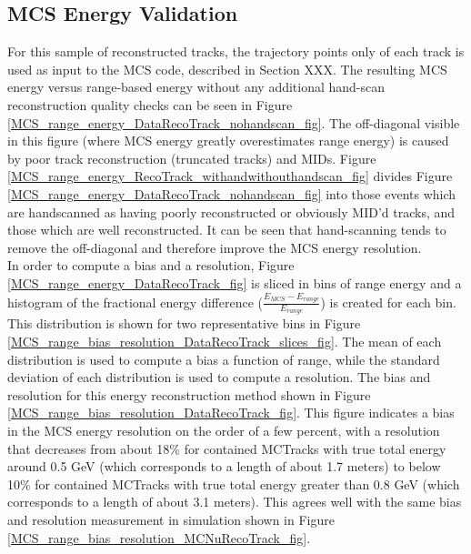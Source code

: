 \subsection{MCS Energy Validation}\label{MCS_Energy_Validation_DataRecoTrack_section}
For this sample of reconstructed tracks, the trajectory points only of each track is used as input to the MCS code, described in Section XXX. The resulting MCS energy versus range-based energy without any additional hand-scan reconstruction quality checks can be seen in Figure \ref{MCS_range_energy_DataRecoTrack_nohandscan_fig}. The off-diagonal visible in this figure (where MCS energy greatly overestimates range energy) is caused by poor track reconstruction (truncated tracks) and MIDs. Figure \ref{MCS_range_energy_RecoTrack_withandwithouthandscan_fig} divides Figure \ref{MCS_range_energy_DataRecoTrack_nohandscan_fig} into those events which are handscanned as having poorly reconstructed or obviously MID'd tracks, and those which are well reconstructed. It can be seen that hand-scanning tends to remove the off-diagonal and therefore improve the MCS energy resolution.\\

In order to compute a bias and a resolution, Figure \ref{MCS_range_energy_DataRecoTrack_fig} is sliced in bins of range energy and a histogram of the fractional energy difference ($\frac{E_{MCS} - E_{range}}{E_{range}}$) is created for each bin. This distribution is shown for two representative bins in Figure \ref{MCS_range_bias_resolution_DataRecoTrack_slices_fig}. The mean of each distribution is used to compute a bias a function of range, while the standard deviation of each distribution is used to compute a resolution. The bias and resolution for this energy reconstruction method shown in Figure \ref{MCS_range_bias_resolution_DataRecoTrack_fig}. This figure indicates a bias in the MCS energy resolution on the order of a few percent, with a resolution that decreases from about 18\% for contained {\sc MCTracks} with true total energy around 0.5 GeV (which corresponds to a length of about 1.7 meters) to below 10\% for contained {\sc MCTracks} with true total energy greater than 0.8 GeV (which corresponds to a length of about 3.1 meters). This agrees well with the same bias and resolution measurement in simulation shown in Figure \ref{MCS_range_bias_resolution_MCNuRecoTrack_fig}.


